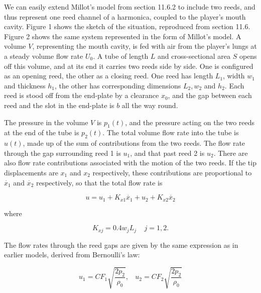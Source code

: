   We can easily extend Millot's model from section 11.6.2 to include two reeds, 
  and thus represent one reed channel of a harmonica, coupled to the player's 
  mouth cavity. Figure 1 shows the sketch of the situation, reproduced from 
  section 11.6. Figure 2 shows the same system represented in the form of 
  Millot's model. A volume $V$, representing the mouth cavity, is fed with air 
  from the player's lungs at a steady volume flow rate $U_0$. A tube of length 
  $L$ and cross-sectional area $S$ opens off this volume, and at its end it 
  carries two reeds side by side. One is configured as an opening reed, the 
  other as a closing reed. One reed has length $L_1$, width $w_1$ and thickness 
  $h_1$, the other has corresponding dimensions $L_2, w_2$ and $h_2$. Each reed 
  is stood off from the end-plate by a clearance $x_0$, and the gap between 
  each reed and the slot in the end-plate is $b$ all the way round. 



  The pressure in the volume $V$ is $p_1(t)$, and the pressure acting on the 
  two reeds at the end of the tube is $p_2(t)$. The total volume flow rate into 
  the tube is $u(t)$, made up of the sum of contributions from the two reeds. 
  The flow rate through the gap surrounding reed 1 is $u_1$, and that past reed 
  2 is $u_2$. There are also flow rate contributions associated with the motion 
  of the two reeds. If the tip displacements are $x_1$ and $x_2$ respectively, 
  these contributions are proportional to $\dot{x_1}$ and $\dot{x_2}$ 
  respectively, so that the total flow rate is 

  $$u=u_1+K_{x1} \dot{x_1} + u_2 +K_{x2} \dot{x_2} \tag{1}$$ 

  where 

  $$K_{xj}=0.4 w_j L_j \mathrm{~~~~~} j=1,2. \tag{2}$$ 

  The flow rates through the reed gaps are given by the same expression as in 
  earlier models, derived from Bernoulli's law: 

  $$u_1=CF_1 \sqrt{\dfrac{2p_2}{\rho_0}}, \mathrm{~~~~}u_2=CF_2 
  \sqrt{\dfrac{2p_2}{\rho_0}} \tag{3}$$ 

